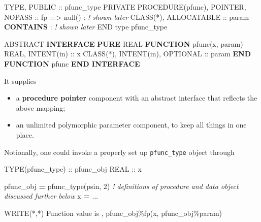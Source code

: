 \documentclass[]{scrartcl}
\newenvironment{Shaded}{}{}
\newcommand{\CommentTok}[1]{\textcolor[rgb]{0.38,0.63,0.69}{\textit{#1}}}
\newcommand{\DataTypeTok}[1]{\textcolor[rgb]{0.56,0.13,0.00}{#1}}
\newcommand{\DecValTok}[1]{\textcolor[rgb]{0.25,0.63,0.44}{#1}}
\newcommand{\FunctionTok}[1]{\textcolor[rgb]{0.02,0.16,0.49}{#1}}
\newcommand{\KeywordTok}[1]{\textcolor[rgb]{0.00,0.44,0.13}{\textbf{#1}}}
\newcommand{\NormalTok}[1]{#1}
\newcommand{\OperatorTok}[1]{\textcolor[rgb]{0.40,0.40,0.40}{#1}}
\newcommand{\StringTok}[1]{\textcolor[rgb]{0.25,0.44,0.63}{#1}}
\providecommand{\tightlist}{%
  \setlength{\itemsep}{0pt}\setlength{\parskip}{0pt}}
\begin{document}
\begin{Shaded}
\begin{Highlighting}[]
\DataTypeTok{TYPE}\NormalTok{, }\DataTypeTok{PUBLIC} \DataTypeTok{::}\NormalTok{ pfunc\_type}
   \DataTypeTok{PRIVATE}
   \DataTypeTok{PROCEDURE(pfunc)}\NormalTok{, }\DataTypeTok{POINTER}\NormalTok{, }\DataTypeTok{NOPASS} \DataTypeTok{::}\NormalTok{ fp }\KeywordTok{=}\OperatorTok{\textgreater{}}\NormalTok{ null()}
\NormalTok{   : }\CommentTok{! shown later}
   \DataTypeTok{CLASS(*)}\NormalTok{, }\DataTypeTok{ALLOCATABLE} \DataTypeTok{::}\NormalTok{ param}
\KeywordTok{CONTAINS}
\NormalTok{   : }\CommentTok{! shown later}
\DataTypeTok{END type}\NormalTok{ pfunc\_type}

\DataTypeTok{ABSTRACT} \KeywordTok{INTERFACE}
   \KeywordTok{PURE} \DataTypeTok{REAL} \KeywordTok{FUNCTION}\NormalTok{ pfunc(x, param)}
      \DataTypeTok{REAL}\NormalTok{, }\DataTypeTok{INTENT(in)} \DataTypeTok{::}\NormalTok{ x}
      \DataTypeTok{CLASS(*)}\NormalTok{, }\DataTypeTok{INTENT(in)}\NormalTok{, }\DataTypeTok{OPTIONAL} \DataTypeTok{::}\NormalTok{ param}
   \KeywordTok{END FUNCTION}\NormalTok{ pfunc}
\KeywordTok{END INTERFACE}
\end{Highlighting}
\end{Shaded}

It supplies

\begin{itemize}
\tightlist
\item
  a \textbf{procedure pointer} component with an abstract interface that
  reflects the above mapping;
\item
  an unlimited polymorphic parameter component, to keep all things in
  one place.
\end{itemize}

Notionally, one could invoke a properly set up \texttt{pfunc\_type}
object through

\begin{Shaded}
\begin{Highlighting}[]
\DataTypeTok{TYPE(pfunc\_type)} \DataTypeTok{::}\NormalTok{ pfunc\_obj}
\DataTypeTok{REAL} \DataTypeTok{::}\NormalTok{ x}

\NormalTok{pfunc\_obj }\KeywordTok{=}\NormalTok{ pfunc\_type(psin, }\DecValTok{2}\NormalTok{)}
\CommentTok{! definitions of procedure and data object discussed further below}
\NormalTok{x }\KeywordTok{=}\NormalTok{ ...}

\FunctionTok{WRITE(*}\NormalTok{,}\FunctionTok{*)} \StringTok{\textquotesingle{}Function value is \textquotesingle{}}\NormalTok{, pfunc\_obj}\OperatorTok{\%}\NormalTok{fp(x, pfunc\_obj}\OperatorTok{\%}\NormalTok{param)}
\end{Highlighting}
\end{Shaded}
\end{document}

